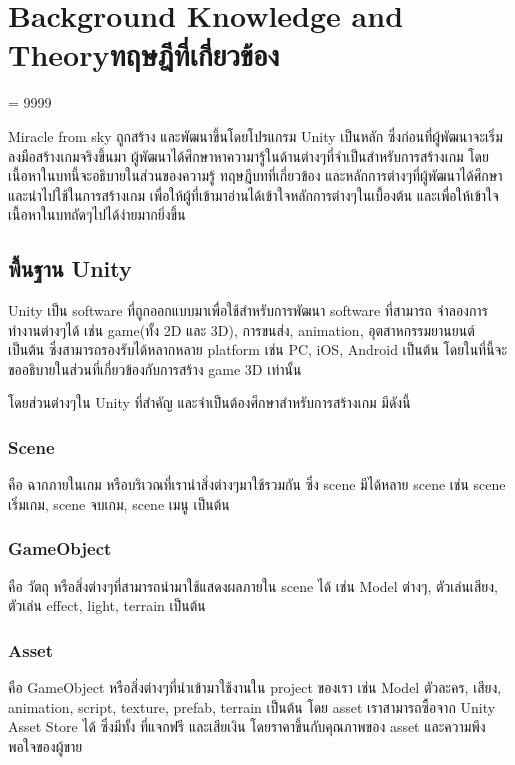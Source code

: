 \chapter{\ifenglish Background Knowledge and Theory\else ทฤษฎีที่เกี่ยวข้อง\fi}
\tolerance = 9999
\overfullrule=0pt

\enskip \enskip \enskip \enskip \enskip Miracle from sky ถูกสร้าง และพัฒนาขึ้นโดยโปรแกรม Unity เป็นหลัก
 ซึ่งก่อนที่ผู้พัฒนาจะเริ่มลงมือสร้างเกมจริงขึ้นมา ผู้พัฒนาได้ศึกษาหาความารู้ในด้านต่างๆที่จำเป็นสำหรับการสร้างเกม  
โดยเนื้อหาในบทนี้จะอธิบายในส่วนของความรู้ ทฤษฎีบทที่เกี่ยวข้อง และหลักการต่างๆที่ผู้พัฒนาได้ศึกษา และนำไปใช้ในการสร้างเกม 
เพื่อให้ผู้ที่เข้ามาอ่านได้เข้าใจหลักการต่างๆในเบื้องต้น และเพื่อให้เข้าใจเนื้อหาในบทถัดๆไปได้ง่ายมากยิ่งขึ้น

\section{พื้นฐาน Unity}
\enskip \enskip \enskip \enskip \enskip Unity เป็น software ที่ถูกออกแบบมาเพื่อใช้สำหรับการพัฒนา software ที่สามารถ
จำลองการทำงานต่างๆได้ เช่น game(ทั้ง 2D และ 3D), การขนส่ง, animation, อุตสาหกรรมยานยนต์ เป็นต้น 
ซึ่งสามารถรองรับได้หลากหลาย platform เช่น PC, iOS, Android เป็นต้น โดยในที่นี้จะขออธิบายในส่วนที่เกี่ยวข้องกับการสร้าง
game 3D เท่านั้น

\enskip \enskip โดยส่วนต่างๆใน Unity ที่สำคัญ และจำเป็นต้องศึกษาสำหรับการสร้างเกม มีดังนี้
\subsection{Scene}
คือ ฉากภายในเกม หรือบริเวณที่เรานำสิ่งต่างๆมาใช้รวมกัน ซึ่ง scene มีได้หลาย scene เช่น scene เริ่มเกม,
 scene จบเกม, scene เมนู เป็นต้น
\subsection{GameObject}
คือ วัตถุ หรือสิ่งต่างๆที่สามารถนำมาใช้แสดงผลภายใน scene ได้ เช่น Model ต่างๆ, ตัวเล่นเสียง,
ตัวเล่น effect, light, terrain เป็นต้น
\subsection{Asset}
คือ GameObject หรือสิ่งต่างๆที่นำเข้ามาใช้งานใน project ของเรา เช่น Model ตัวละคร, เสียง, animation,
script, texture, prefab, terrain เป็นต้น โดย asset เราสามารถซื้อจาก Unity Asset Store ได้ ซึ่งมีทั้ง
ที่แจกฟรี และเสียเงิน โดยราคาขึ้นกับคุณภาพของ asset และความพึงพอใจของผู้ขาย
